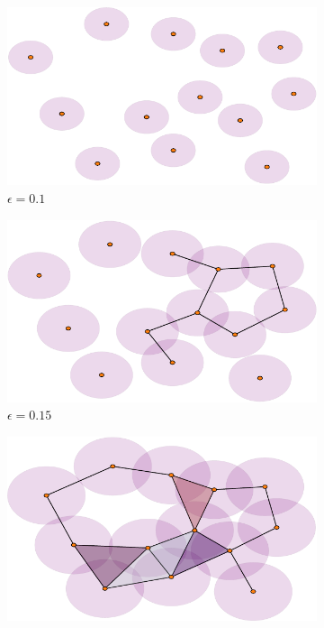 \begin{figure}
  \centering
  \begin{subfigure}[t]{.5\linewidth}
    \includegraphics[scale=.5]{rips_eps=01-crop.pdf}
    \caption{$\epsilon=0.1$}
 \end{subfigure}%
  \begin{subfigure}[t]{.5\linewidth}
    \includegraphics[scale=.5]{rips_eps=015-crop.pdf}
    \caption{$\epsilon=0.15$}
 \end{subfigure}
  \begin{subfigure}[b]{.49\linewidth}
    \includegraphics[scale=.5]{rips_eps=02-crop.pdf}

\end{subfigure}
\end{figure}
